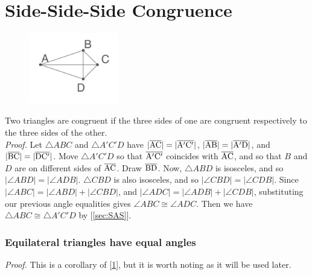\documentclass{report}
\begin{document}
\section{Side-Side-Side Congruence}
\label{sec:SSS}
\begin{figure} %
    \centering
    \includegraphics[width=0.35\textwidth]{SSS}
\end{figure}
Two triangles are congruent if the three sides of one are congruent respectively to the three sides of the other.
\\[\baselineskip]
\textit{Proof.} Let $\triangle{ABC}$ and $\triangle{A'C'D}$ have $|\overline{\rm AC}|=|\overline{\rm A'C'}|$, $|\overline{\rm AB}|=|\overline{\rm A'D}|$, and $|\overline{\rm BC}|=|\overline{\rm DC'}|$. Move $\triangle{A'C'D}$ so that $\overline{\rm A'C'}$ coincides with $\overline{\rm AC}$, and so that $B$ and $D$ are on different sides of $\overline{\rm AC}$. Draw $\overline{\rm BD}$. Now, $\triangle{ABD}$ is isosceles, and so $|\angle ABD| = |\angle ADB|$. $\triangle{CBD}$ is also isosceles, and so $|\angle CBD| = |\angle CDB|$. Since $|\angle ABC| = |\angle ABD|+|\angle CBD|$, and $|\angle ADC| = |\angle ADB|+|\angle CDB|$, substituting our previous angle equalities gives $\angle ABC \cong \angle ADC$. Then we have $\triangle{ABC} \cong \triangle{A'C'D}$ by [\ref{sec:SAS}].

\subsubsection{Equilateral triangles have equal angles}
\textit{Proof.} This is a corollary of [\ref{sec:SSS}], but it is worth noting as it will be used later.
\end{document}
